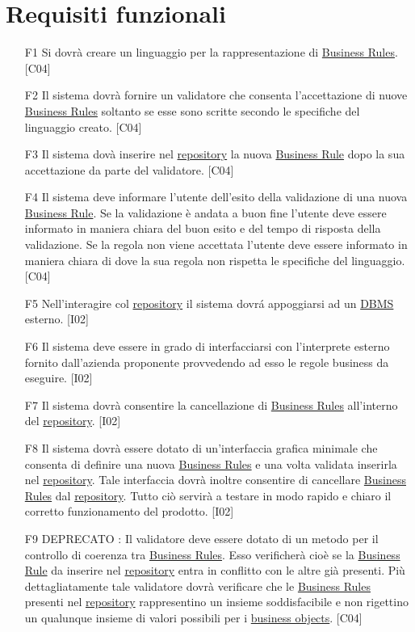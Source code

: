 \section{Requisiti funzionali}
\begin{itemize}
\item[F1]{Si dovr\`a creare un linguaggio per la rappresentazione di \underline{Business Rules}. [C04]}
\item[F2]{Il sistema dovr\`a fornire un validatore che consenta l'accettazione di nuove \underline{Business Rules} soltanto se esse sono scritte secondo le specifiche del linguaggio creato. [C04]}
\item[F3]{Il sistema dov\`a inserire nel \underline{repository} la nuova \underline{Business Rule} dopo la sua accettazione da parte del validatore. [C04]}
\item[F4]{Il sistema deve informare l'utente dell'esito della validazione di una nuova \underline{Business Rule}. Se la validazione \`e andata a buon fine l'utente deve essere informato in maniera chiara del buon esito e del tempo di risposta della validazione. Se la regola non viene accettata l'utente deve essere informato in maniera chiara di dove la sua regola non rispetta le specifiche del linguaggio. [C04]}
\item[F5]{Nell'interagire col \underline{repository} il sistema dovr\'a appoggiarsi ad un \underline{DBMS} esterno. [I02]}
\item[F6]{Il sistema deve essere in grado di interfacciarsi con l'interprete esterno fornito dall'azienda proponente provvedendo ad esso le regole business da eseguire. [I02]}
\item[F7]{Il sistema dovr\`a consentire la cancellazione di \underline{Business Rules} all'interno del \underline{repository}. [I02]}
\item[F8]{Il sistema dovr\`a essere dotato di un'interfaccia grafica minimale che consenta di definire una nuova \underline{Business Rules} e una volta validata inserirla nel \underline{repository}. Tale interfaccia dovr\`a inoltre consentire di cancellare \underline{Business Rules} dal \underline{repository}. Tutto ci\`o servir\`a a testare in modo rapido e chiaro il corretto funzionamento del prodotto. [I02]}
\item[F9]{ DEPRECATO : Il validatore deve essere dotato di un metodo per il controllo di coerenza tra \underline{Business Rules}. Esso verificher\`a cio\`e se la \underline{Business Rule} da inserire nel \underline{repository} entra in conflitto con le altre gi\`a presenti. Pi\`u dettagliatamente tale validatore dovr\`a verificare che le \underline{Business Rules} presenti nel \underline{repository} rappresentino un insieme soddisfacibile e non rigettino un qualunque insieme di valori possibili per i \underline{business objects}. [C04]}

\end{itemize}
